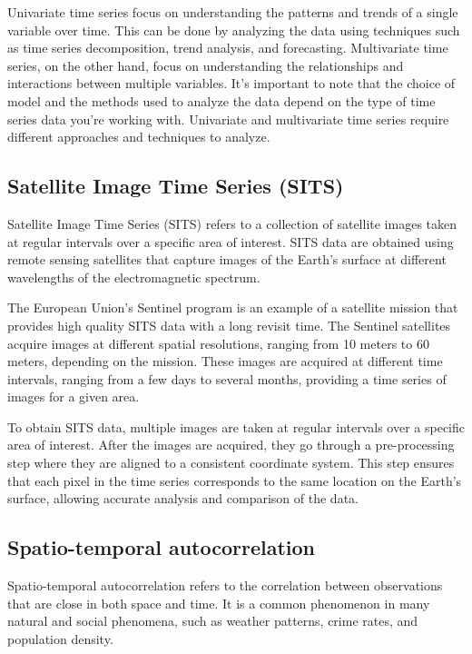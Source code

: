Univariate time series focus on understanding the patterns and trends of a single variable over time. This can be done by analyzing the data using techniques such as time series decomposition, trend analysis, and forecasting.
Multivariate time series, on the other hand, focus on understanding the relationships and interactions between multiple variables. 
It's important to note that the choice of model and the methods used to analyze the data depend on the type of time series data you're working with. Univariate and multivariate time series require different approaches and techniques to analyze.

\subsection{Satellite Image Time Series (SITS)}

Satellite Image Time Series (SITS) refers to a collection of satellite images taken at regular intervals over a specific area of interest. 
SITS data are obtained using remote sensing satellites that capture images of the Earth's surface at different wavelengths of the electromagnetic spectrum.

The European Union's Sentinel program is an example of a satellite mission that provides high quality SITS data with a long revisit time.
The Sentinel satellites acquire images at different spatial resolutions, ranging from 10 meters to 60 meters, depending on the mission. 
These images are acquired at different time intervals, ranging from a few days to several months, providing a time series of images for a given area.

To obtain SITS data, multiple images are taken at regular intervals over a specific area of interest. 
After the images are acquired, they go through a pre-processing step where they are aligned to a consistent coordinate system. 
This step ensures that each pixel in the time series corresponds to the same location on the Earth's surface, allowing accurate analysis and comparison of the data.

\subsection{Spatio-temporal autocorrelation}
Spatio-temporal autocorrelation \cite{doi:10.1080/10095020.2019.1643609} refers to the correlation between observations that are close in both space and time. 
It is a common phenomenon in many natural and social phenomena, such as weather patterns, crime rates, and population density.

